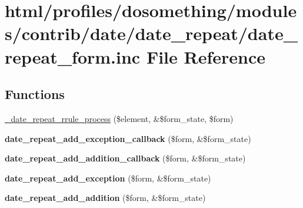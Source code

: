 \hypertarget{date__repeat__form_8inc}{
\section{html/profiles/dosomething/modules/contrib/date/date\_\-repeat/date\_\-repeat\_\-form.inc File Reference}
\label{date__repeat__form_8inc}
}
\subsection*{Functions}
\begin{DoxyCompactItemize}
\item 
\hyperlink{date__repeat__form_8inc_ae8a7a65ffe8a8e9438fe223150e44293}{\_\-date\_\-repeat\_\-rrule\_\-process} (\$element, \&\$form\_\-state, \$form)
\item 
\hypertarget{date__repeat__form_8inc_a70bd0457350d0e65ff304c8139d204b0}{
{\bfseries date\_\-repeat\_\-add\_\-exception\_\-callback} (\$form, \&\$form\_\-state)}
\label{date__repeat__form_8inc_a70bd0457350d0e65ff304c8139d204b0}

\item 
\hypertarget{date__repeat__form_8inc_a20ba1e7862c3fbccf3b6def80ab8a891}{
{\bfseries date\_\-repeat\_\-add\_\-addition\_\-callback} (\$form, \&\$form\_\-state)}
\label{date__repeat__form_8inc_a20ba1e7862c3fbccf3b6def80ab8a891}

\item 
\hypertarget{date__repeat__form_8inc_a65418069672eb439f07648ca8ecd354e}{
{\bfseries date\_\-repeat\_\-add\_\-exception} (\$form, \&\$form\_\-state)}
\label{date__repeat__form_8inc_a65418069672eb439f07648ca8ecd354e}

\item 
\hypertarget{date__repeat__form_8inc_a2b209a28b952ba01a71baaa76e01c69c}{
{\bfseries date\_\-repeat\_\-add\_\-addition} (\$form, \&\$form\_\-state)}
\label{date__repeat__form_8inc_a2b209a28b952ba01a71baaa76e01c69c}


\end{DoxyCompactItemize}
